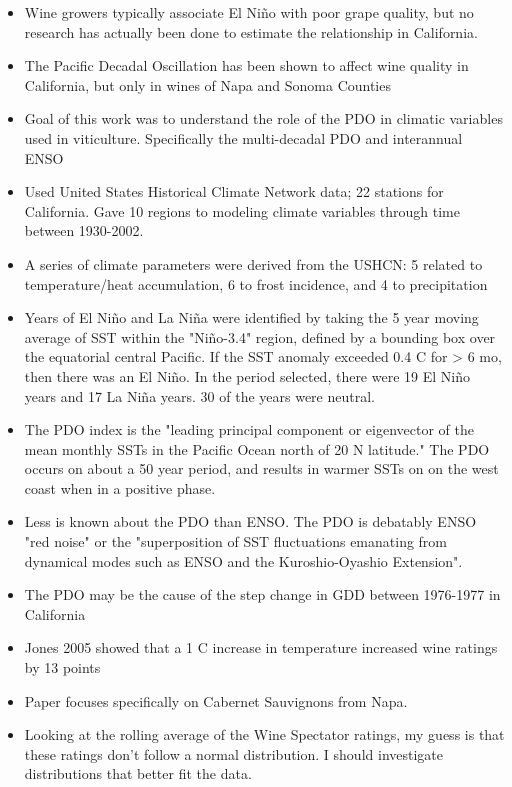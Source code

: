 \begin{itemize}
\tightlist
  \item
    Wine growers typically associate El Niño with poor grape quality, but no research has actually been done to estimate the relationship in California. 
  \item
    The Pacific Decadal Oscillation has been shown to affect wine quality in California, but only in wines of Napa and Sonoma Counties
  \item
    Goal of this work was to understand the role of the PDO in climatic variables used in viticulture. Specifically the multi-decadal PDO and interannual ENSO
  \item
    Used United States Historical Climate Network data; 22 stations for California. Gave 10 regions to modeling climate variables through time between 1930-2002.
  \item
    A series of climate parameters were derived from the USHCN: 5 related to temperature/heat accumulation, 6 to frost incidence, and 4 to precipitation
  \item
    Years of El Niño and La Niña were identified by taking the 5 year moving average of SST within the "Niño-3.4" region, defined by a bounding box over the equatorial central Pacific. If the SST anomaly exceeded 0.4 \textdegree C for > 6 mo, then there was an El Niño. In the period selected, there were 19 El Niño years and 17 La Niña years. 30 of the years were neutral.
  \item
    The PDO index is the "leading principal component or eigenvector of the mean monthly SSTs in the Pacific Ocean north of 20 \textdegree N latitude." The PDO occurs on about a 50 year period, and results in warmer SSTs on on the west coast when in a positive phase.
  \item
    Less is known about the PDO than ENSO. The PDO is debatably ENSO "red noise" or the "superposition of SST fluctuations emanating from dynamical modes such as ENSO and the Kuroshio-Oyashio Extension".
  \item
    The PDO may be the cause of the step change in GDD between 1976-1977 in California
  \item
    Jones 2005 showed that a 1 \textdegree C increase in temperature increased wine ratings by 13 points
  \item
    Paper focuses specifically on Cabernet Sauvignons from Napa.
  \item
    Looking at the rolling average of the Wine Spectator ratings, my guess is that these ratings don't follow a normal distribution. I should investigate distributions that better fit the data.

\end{itemize}
